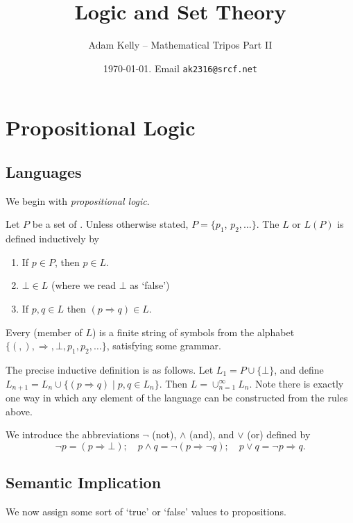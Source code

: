 \documentclass[a4paper, 10pt, twocolumn]{amsart}
\title{Logic and Set Theory}
\author{Adam Kelly -- Mathematical Tripos Part II}
\date{\today. Email \texttt{ak2316@srcf.net}}
\begin{document}
\maketitle

\section{Propositional Logic}

\subsection{Languages}

We begin with \emph{propositional logic}.

\begin{definition}[Language]
  Let $P$ be a set of . Unless otherwise stated, $P = \{p_1$, $p_2, \dots\}$. The  $L$ or $L(P)$ is defined inductively by
  \begin{enumerate}
    \item If $p \in P$, then $p \in L$.
    \item $\bot \in L$ (where we read $\bot$ as `false')
    \item If $p, q \in L$ then $(p \Rightarrow q) \in L$.
  \end{enumerate}
\end{definition}

Every  (member of $L$) is a finite string of symbols from the alphabet $\{(,),\Rightarrow, \bot, p_1, p_2, \dots\}$, satisfying some grammar.

The precise inductive definition is as follows. Let $L_1 = P \cup \{\bot\}$, and define $L_{n + 1} = L_n \cup \{(p \Rightarrow q) \mid p, q \in L_n\}$. Then $L = \cup_{n = 1}^{\infty} L_n$.
Note there is exactly one way in which any element of the language can be constructed from the rules above.

We introduce the abbreviations $\lnot$ (not), $\land$ (and), and $\lor$ (or) defined by 
$$
\lnot p = (p \Rightarrow \bot); \quad p \land q = \lnot(p \Rightarrow \lnot q); \quad p \lor q = \lnot p \Rightarrow q.
$$

\subsection{Semantic Implication}

We now assign some sort of `true' or `false' values to propositions.
\end{document}

